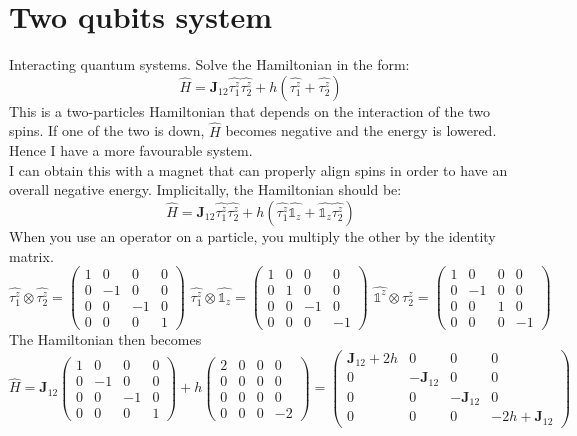 \section{Two qubits system}
Interacting quantum systems. Solve the Hamiltonian in the form:
\[
\hat{H}=\mathbf{J}_{12}\hat{\tau_1^z}\hat{\tau_2^z}+h(\hat{\tau_1^z}+\hat{\tau_2^z})
\]
This is a two-particles Hamiltonian that depends on the interaction of the two spins. If one of the two is down, $\hat{H}$ becomes negative and the energy is lowered. Hence I have a more favourable system. \\
I can obtain this with a magnet that can properly align spins in order to have an overall negative energy. Implicitally, the Hamiltonian should be:
\[
\hat{H}=\mathbf{J}_{12}\hat{\tau_1^z}\hat{\tau_2^z}+h(\hat{\tau_1^z}\hat{\mathbb{1}_z}+\hat{\mathbb{1}_z}\hat{\tau_2^z})
\]
When you use an operator on a particle, you multiply the other by the identity matrix.
\[
\hat{\tau_1^z}\otimes\hat{\tau_2^z}=\begin{pmatrix}1&0&0&0\\0&-1&0&0\\0&0&-1&0\\0&0&0&1\end{pmatrix}\,\,
\hat{\tau_1^z}\otimes\hat{\mathbb{1}_z}=\begin{pmatrix}1&0&0&0\\0&1&0&0\\0&0&-1&0\\0&0&0&-1\end{pmatrix}\,\,
\hat{\mathbb{1}^z}\otimes\hat{\tau_2^z}=\begin{pmatrix}1&0&0&0\\0&-1&0&0\\0&0&1&0\\0&0&0&-1\end{pmatrix}
\]
The Hamiltonian then becomes
\[
\hat{H}=\mathbf{J}_{12}\begin{pmatrix}1&0&0&0\\0&-1&0&0\\0&0&-1&0\\0&0&0&1\end{pmatrix}+h\begin{pmatrix}2&0&0&0\\0&0&0&0\\0&0&0&0\\0&0&0&-2\end{pmatrix}=\begin{pmatrix}\mathbf{J}_{12}+2h&0&0&0\\0&-\mathbf{J}_{12}&0&0\\0&0&-\mathbf{J}_{12}&0\\0&0&0&-2h+\mathbf{J}_{12}\end{pmatrix}
\]
